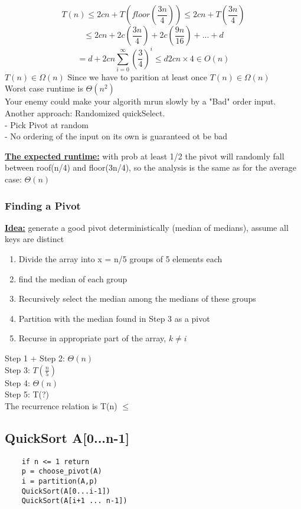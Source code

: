 \documentclass[12pt]{article}
\newcommand{\myt}[1]{\textbf{\underline{#1}}}
\begin{document}
	$$T(n) \leq 2cn + T(floor(\frac{3n}{4})) \leq 2cn + T(\frac{3n}{4})$$
	$$\leq 2cn + 2c(\frac{3n}{4}) + 2c(\frac{9n}{16}) + ... + d$$
	$$= d + 2cn \sum_{i=0}^{\infty}(\frac{3}{4})^i \leq d 2cn \times 4 \in O(n)$$
	$T(n) \in \Omega(n)$ Since we have to parition at least once $T(n) \in \Omega(n)$\\
	
	Worst case runtime is $\Theta(n^2)$\\
	
	Your enemy could make your algorith mrun slowly by a "Bad" order input.\\
	Another approach: Randomized quickSelect.\\
	- Pick Pivot at random\\
	- No ordering of the input on its own is guaranteed ot be bad
	
	\myt{The expected runtime:} with prob at least 1/2 the pivot will randomly fall between roof(n/4) and floor(3n/4), so the analysis is the same as for the average case: $\Theta(n)$\\
	
	\subsubsection*{Finding a Pivot}
	\myt{Idea:} generate a good pivot deterministically (median of medians), assume all keys are distinct\\
	\begin{enumerate}
		\item Divide the array into x = n/5 groups of 5 elements each
		\item find the median of each group
		\item Recursively select the median among the medians of these groups
		\item Partition with the median found in Step 3 as a pivot
		\item Recurse in appropriate part of the array, $k \neq i$
	\end{enumerate}
	Step 1 + Step 2: $\Theta(n)$\\
	Step 3: $T(\frac{n}{5})$\\
	Step 4: $\Theta(n)$\\
	Step 5: T(?)\\
	
	The recurrence relation is T(n) $\leq$
	
	\subsection*{QuickSort A[0...n-1]}
	\begin{verbatim}
	if n <= 1 return
	p = choose_pivot(A)
	i = partition(A,p)
	QuickSort(A[0...i-1])
	QuickSort(A[i+1 ... n-1])
	\end{verbatim}
	
\end{document}
